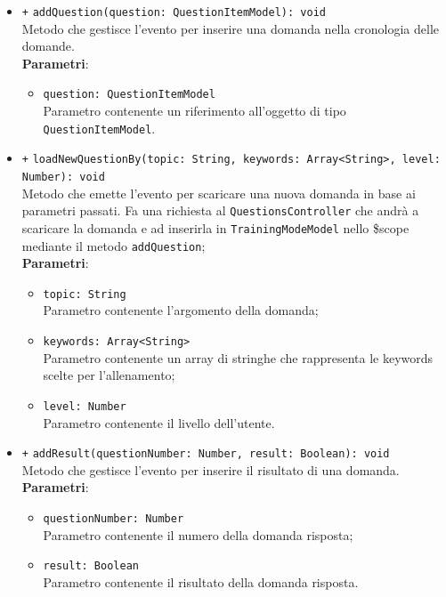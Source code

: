 \begin{itemize}
\begin{itemize}
\begin{itemize}
		\end{itemize}
		\item \texttt{+} \texttt{addQuestion(question: QuestionItemModel): void} \\
		Metodo che gestisce l'evento per inserire una domanda nella cronologia delle domande. \\
		\textbf{Parametri}:
		\begin{itemize}
			\item \texttt{question: QuestionItemModel} \\
			Parametro contenente un riferimento all'oggetto di tipo \texttt{QuestionItemModel}.
		\end{itemize}
		\item \texttt{+} \texttt{loadNewQuestionBy(topic: String, keywords: Array<String>, level: Number): void} \\
		Metodo che emette l'evento per scaricare una nuova domanda in base ai parametri passati. Fa una richiesta al \texttt{QuestionsController} che andrà a scaricare la domanda e ad inserirla in \texttt{TrainingModeModel} nello \$scope mediante il metodo \texttt{addQuestion}; \\
		\textbf{Parametri}:
		\begin{itemize}
			\item \texttt{topic: String} \\
			Parametro contenente l'argomento della domanda;
			\item \texttt{keywords: Array<String>} \\
			Parametro contenente un array di stringhe che rappresenta le keywords scelte per l'allenamento;
			\item \texttt{level: Number} \\
			Parametro contenente il livello dell'utente.
		\end{itemize}
		\item \texttt{+} \texttt{addResult(questionNumber: Number, result: Boolean): void} \\
		Metodo che gestisce l'evento per inserire il risultato di una domanda. \\
		\textbf{Parametri}:
		\begin{itemize}
			\item \texttt{questionNumber: Number} \\
			Parametro contenente il numero della domanda risposta;
			\item \texttt{result: Boolean} \\
			Parametro contenente il risultato della domanda risposta.

\end{itemize}
\end{itemize}
\end{itemize}
